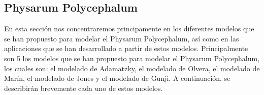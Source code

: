 \subsection{Physarum Polycephalum}
\label{sub:PhysarumArte}
    En esta secci\'on nos concentraremos principamente en los diferentes modelos que se han propuesto para modelar el 
        Physarum Polycephalum, as\'i como en las aplicaciones que se han desarrollado a partir de estos modelos.
        Principalmente son 5 los modelos que se han propuesto para modelar el Physarum Polycephalum, los cuales son:
        el modelado de Adamatzky, el modelado de Olvera, el modelado de Mar\'in, el modelado de Jones y el modelado de
        Gunji. A continuaci\'on, se describir\'an brevemente cada uno de estos modelos.
